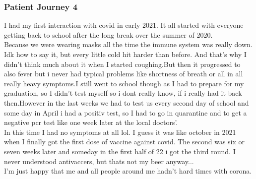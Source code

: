 \subsubsection{Patient Journey 4}\label{apx:pj4}
I had my first interaction with covid in early 2021. It all started with everyone getting back to school after the long break over the summer of 2020.\\
Because we were wearing masks all the time the immune system was really down. Idk how to say it, but every little cold hit harder than before. And that's why I didn't think much about it when I started coughing.But then it progressed to also fever but i never had typical problems like shortness of breath or all in all really heavy symptoms.I still went to school though as I had to prepare for my graduation, so I didn't test myself so i dont really know, if i really had it back then.However in the last weeks we had to test us every second day of school and some day in April i had a positiv test, so I had to go in quarantine and to get a negative pcr test like one week later at the local doctors'.\\
In this time I had no symptoms at all lol. I guess it was like october in 2021 when I finally got the first dose of vaccine against covid. The second was six or seven weeks later and someday in the first half of 22 i got the third round. I never understood antivaccers, but thats not my beer anyway...\\
I'm just happy that me and all people around me hadn't hard times with corona.
